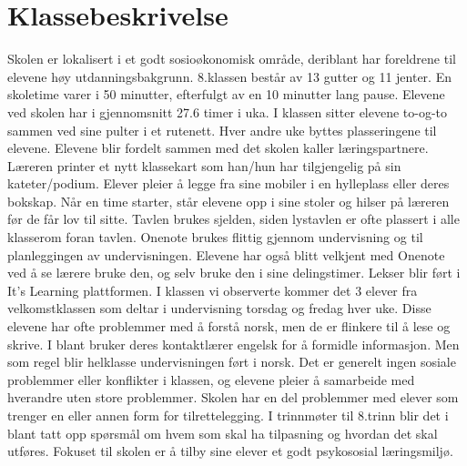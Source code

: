 \documentclass[main.tex]{subfiles}
\begin{document}
\appendix
\section{Klassebeskrivelse}
Skolen er lokalisert i et godt sosioøkonomisk område, deriblant har foreldrene til elevene høy
utdanningsbakgrunn. 8.klassen består av 13 gutter og 11 jenter. En skoletime varer i 50
minutter, efterfulgt av en 10 minutter lang pause. Elevene ved skolen har i gjennomsnitt 27.6
timer i uka. I klassen sitter elevene to-og-to sammen ved sine pulter i et rutenett. Hver andre
uke byttes plasseringene til elevene. Elevene blir fordelt sammen med det skolen kaller
læringspartnere. Læreren printer et nytt klassekart som han/hun har tilgjengelig på sin
kateter/podium. Elever pleier å legge fra sine mobiler i en hylleplass eller deres bokskap. Når en
time starter, står elevene opp i sine stoler og hilser på læreren før de får lov til sitte. Tavlen
brukes sjelden, siden lystavlen er ofte plassert i alle klasserom foran tavlen. Onenote brukes
flittig gjennom undervisning og til planleggingen av undervisningen. Elevene har også blitt
velkjent med Onenote ved å se lærere bruke den, og selv bruke den i sine delingstimer. Lekser
blir ført i It’s Learning plattformen. I klassen vi observerte kommer det 3 elever fra
velkomstklassen som deltar i undervisning torsdag og fredag hver uke. Disse elevene har ofte
problemmer med å forstå norsk, men de er flinkere til å lese og skrive. I blant bruker deres
kontaktlærer engelsk for å formidle informasjon. Men som regel blir helklasse undervisningen
ført i norsk. Det er generelt ingen sosiale problemmer eller konflikter i klassen, og elevene pleier
å samarbeide med hverandre uten store problemmer. Skolen har en del problemmer med
elever som trenger en eller annen form for tilrettelegging. I trinnmøter til 8.trinn blir det i blant tatt
opp spørsmål om hvem som skal ha tilpasning og hvordan det skal utføres. Fokuset til skolen er
å tilby sine elever et godt psykososial læringsmiljø.

\newpage\null
\end{document}
